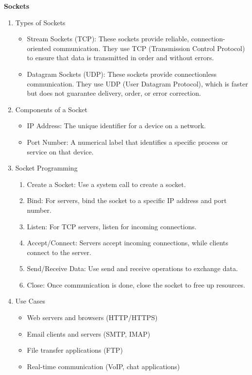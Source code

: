 \documentclass{article}
\begin{document}
\textbf{Sockets}

\begin{enumerate}[label = \arabic*]
\item Types of Sockets
	\begin{itemize}
	\item Stream Sockets (TCP): These sockets provide reliable, connection-oriented communication. They use TCP (Transmission Control Protocol) to ensure that data is transmitted in order and without errors.
	\item Datagram Sockets (UDP): These sockets provide connectionless communication. They use UDP (User Datagram Protocol), which is faster but does not guarantee delivery, order, or error correction.
	\end{itemize}
\item Components of a Socket
	\begin{itemize}
	\item IP Address: The unique identifier for a device on a network.
	\item Port Number: A numerical label that identifies a specific process or service on that device.
	\end{itemize}
\item Socket Programming
	\begin{enumerate}[label=\arabic*]
	\item Create a Socket: Use a system call to create a socket.
	\item Bind: For servers, bind the socket to a specific IP address and port number.
	\item Listen: For TCP servers, listen for incoming connections.
	\item Accept/Connect: Servers accept incoming connections, while clients connect to the server.
	\item Send/Receive Data: Use send and receive operations to exchange data.
	\item Close: Once communication is done, close the socket to free up resources.
	\end{enumerate}
\item Use Cases
	\begin{itemize}
	\item Web servers and browsers (HTTP/HTTPS)
	\item Email clients and servers (SMTP, IMAP)
	\item File transfer applications (FTP)
	\item Real-time communication (VoIP, chat applications)
	\end{itemize}
\end{enumerate}
\end{document}
